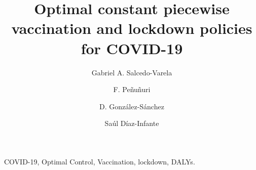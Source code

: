\begin{frontmatter}
    \title{
        Optimal constant piecewise vaccination and lockdown
        policies for COVID-19
    }
    \author[add:unison]%
    {Gabriel A. Salcedo-Varela
    }
    \address[add:unison]{
        Departamento de Matem\'aticas, Universidad de Sonora,
        Blvd. Luis Encinas y Rosales S/N,
        Hermosillo, Sonora, M\'exico, C.P. 83000.
    }
    \author[add:UADY]%
    {F. Pe\~nu\~nuri}
    \address[add:UADY]{Facultad de Ingenier\'ia, Universidad
    Aut\'onoma de Yucat\'an, A.P. 150, Cordemex, M\'erida, Yucat\'an,
    M\'exico.}
    \author[add:conacyt_unison]{D. Gonz\'alez-S\'anchez}
        \address[add:conacyt_unison]{
        CONACYT-Universidad de Sonora,
        Departamento de Matem\'aticas,
        Blvd. Luis Encinas y Rosales S/N,
        Hermosillo, Sonora, M\'exico, C.P. 83000.
    }
    \author[add:conacyt_unison]{%
        Sa\'ul D\'iaz-Infante%
    }%
    \begin{keyword}
        COVID-19, Optimal Control,
        Vaccination, lockdown, DALYs.
    \end{keyword}
    
\end{frontmatter}